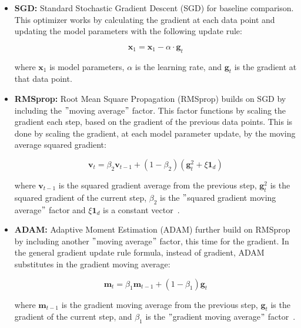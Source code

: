 \begin{itemize}
    \item \textbf{SGD:} Standard Stochastic Gradient Descent (SGD) for baseline comparison.
    This optimizer works by calculating the gradient at each data
    point and updating the model parameters with the following update rule:

    \[
        \mathbf{x}_1 = \mathbf{x}_1 - \alpha \cdot \mathbf{g}_t
    \]

    where $\mathbf{x}_1$ is model parameters, $\alpha$ is
    the learning rate, and $\mathbf{g}_t$ is the gradient at that data point.

    \item \textbf{RMSprop:} Root Mean Square Propagation (RMSprop) builds on SGD by including the \("\)moving average\("\) factor.
    This factor functions by scaling the gradient
    each step, based on the gradient of the previous data points.
    This is done by scaling the gradient, at each model parameter update,
    by the moving average squared gradient:

    \[
        \mathbf{v}_t = \beta_2 \mathbf{v}_{t-1} + (1 - \beta_2)(\mathbf{g}_t^2 + \xi \mathbf{1}_d)
    \]

    where $\mathbf{v}_{t-1}$ is the squared gradient average from the previous step, $\mathbf{g}_t^2 $ is
    the squared gradient of the current step, $\beta_2$ is the \("\)squared gradient moving average\("\) factor
    and $\xi \mathbf{1}_d$ is a constant vector~\cite{DBLP:journals/corr/abs-1807-06766,Jason_Huang_2020}.

    \item \textbf{ADAM:} Adaptive Moment Estimation (ADAM) further build on RMSprop by including another \("\)moving average\("\) factor, this time for the gradient.
    In the general gradient update rule formula, instead of gradient,
    ADAM substitutes in the gradient moving average:

    \[
        \mathbf{m}_t = \beta_1 \mathbf{m}_{t-1} + (1 - \beta_1) \mathbf{g}_t
    \]

    where $\mathbf{m}_{t-1}$ is the gradient moving average from the previous step, $\mathbf{g}_t$ is
    the gradient of the current step, and $\beta_1$ is the \("\)gradient moving average\("\) factor~\cite{DBLP:journals/corr/abs-1807-06766}.

\end{itemize}

